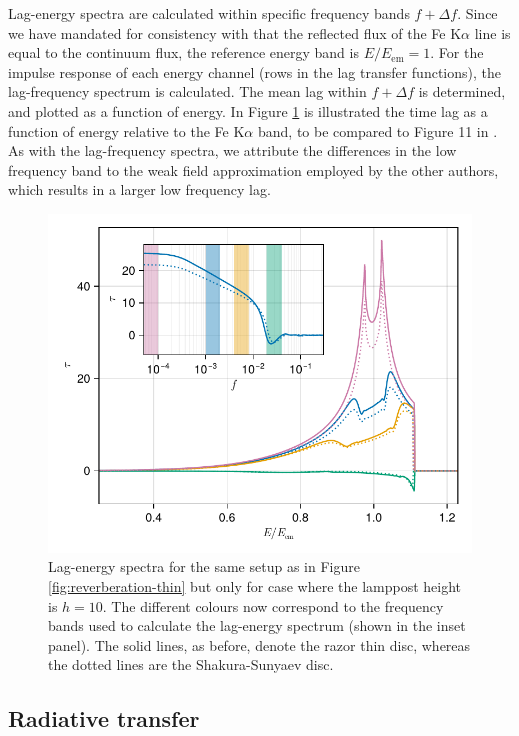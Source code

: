 \documentclass[fleqn,usenatbib]{mnras}
\newcommand{\FeKa}{Fe K$\alpha$\xspace}
\begin{document}
Lag-energy spectra are calculated within specific frequency bands $f + \Delta
f$. Since we have mandated for consistency with \cite{cackett_modelling_2014}
that the reflected flux of the \FeKa line is equal to the continuum flux,
the reference energy band is $E/E_\text{em} = 1$.  For the impulse response of
each energy channel (rows in the lag transfer functions), the lag-frequency
spectrum is calculated. The mean lag within $f + \Delta f$ is determined, and
plotted as a function of energy. In Figure \ref{fig:lag-energy} is illustrated
the time lag as a function of energy relative to the \FeKa band,
to be compared to Figure 11 in \cite{cackett_modelling_2014}. As with the
lag-frequency spectra, we attribute the differences in the low frequency band to
the weak field approximation employed by the other authors, which results in a
larger low frequency lag.

\begin{figure}
	\centering
	\includegraphics[width=0.98\linewidth]{figures/reverberation.lag-energy.pdf}
	\caption{Lag-energy spectra for the same setup as in Figure
    \ref{fig:reverberation-thin} but only for case where the lamppost height is
$h=10$. The different colours now correspond to the frequency bands used to
calculate the lag-energy spectrum (shown in the inset panel). The solid lines,
as before, denote the razor thin disc, whereas the dotted lines are the
Shakura-Sunyaev disc.}
	\label{fig:lag-energy}
\end{figure}


\subsection{Radiative transfer}
\end{document}
